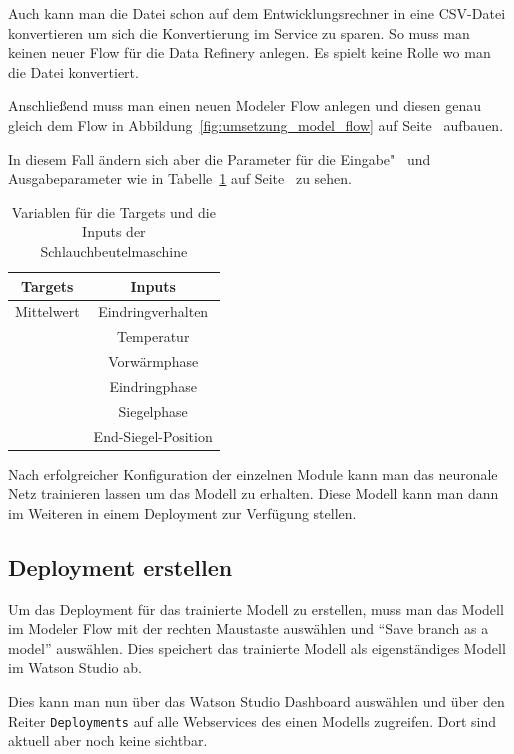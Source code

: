 Auch kann man die Datei schon auf dem Entwicklungsrechner in eine CSV-Datei konvertieren um sich die Konvertierung im
Service zu sparen. So muss man keinen neuer Flow für die Data Refinery anlegen. Es spielt keine Rolle wo man die Datei
konvertiert.

Anschließend muss man einen neuen Modeler Flow anlegen und diesen genau gleich dem Flow in
Abbildung~\ref{fig:umsetzung_model_flow} auf Seite~\pageref{fig:umsetzung_model_flow} aufbauen.

In diesem Fall ändern sich aber die Parameter für die Eingabe"~ und Ausgabeparameter wie in
Tabelle~\ref{tab:targets_inputs_siegeln} auf Seite~\pageref{tab:targets_inputs_siegeln} zu sehen.

\begin{table}[h]
    \centering
    \begin{tabular}{|c|c|}
        \hline
        \textbf{Targets} & \textbf{Inputs}\\
        \hline
        \hline
        Mittelwert & Eindringverhalten\\
        \hline
        & Temperatur\\
        \hline
        & Vorwärmphase\\
        \hline
        & Eindringphase\\
        \hline
        & Siegelphase\\
        \hline
        & End-Siegel-Position\\
        \hline
    \end{tabular}
    \caption{Variablen für die Targets und die Inputs der Schlauchbeutelmaschine}
    \label{tab:targets_inputs_siegeln}
\end{table}

Nach erfolgreicher Konfiguration der einzelnen Module kann man das neuronale Netz trainieren lassen um das Modell zu
erhalten. Diese Modell kann man dann im Weiteren in einem Deployment zur Verfügung stellen.

\subsection{Deployment erstellen}
Um das Deployment für das trainierte Modell zu erstellen, muss man das Modell im Modeler Flow mit der rechten Maustaste
auswählen und \enquote{Save branch as a model} auswählen. Dies speichert das trainierte Modell als eigenständiges Modell
im Watson Studio ab.

Dies kann man nun über das Watson Studio Dashboard auswählen und über den Reiter \texttt{Deployments} auf alle
Webservices des einen Modells zugreifen. Dort sind aktuell aber noch keine sichtbar.

